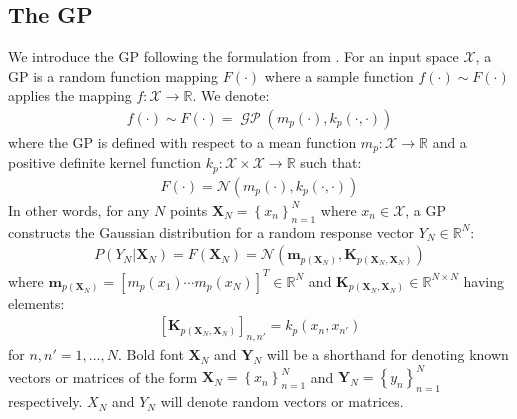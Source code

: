 \documentclass{article}
\newcommand{\GP}{\operatorname{\mathcal{GP}}}
\numberwithin{equation}{section}
\begin{document}
\subsection{The GP}\label{section:the-gp}
We introduce the GP following the formulation from \cite{rasmussen2003gaussian}. For an input space $\mathcal{X}$, a GP is a random function mapping $F(\cdot)$ where a sample function $f(\cdot) \sim F(\cdot)$ applies the mapping $f: \mathcal{X} \rightarrow \mathbb{R}$. We denote:
\begin{align}
    f(\cdot) \sim F(\cdot) = \GP\left(m_p(\cdot), k_p(\cdot, \cdot)\right)
    \label{gp}
\end{align}
where the GP is defined with respect to a mean function $m_p: \mathcal{X} \rightarrow \mathbb{R}$ and a positive definite kernel function $k_p: \mathcal{X} \times \mathcal{X} \rightarrow \mathbb{R}$ such that:
\begin{align}
    F(\cdot) = \mathcal{N}(m_p(\cdot), k_p(\cdot, \cdot))
    \label{gp-normal}
\end{align}
In other words, for any $N$ points $\mathbf{X}_N = \left\{ x_n\right\}_{n=1}^N$ where $x_n \in \mathcal{X}$, a GP constructs the Gaussian distribution for a random response vector $Y_N \in \mathbb{R}^{N}$:
\begin{align}
    \label{gp-vector}
    P\left(Y_N \vert \mathbf{X}_N\right) = F\left( \mathbf{X}_N\right) = \mathcal{N}\left(\mathbf{m}_{p\left(\mathbf{X}_N\right)}, \mathbf{K}_{p\left(\mathbf{X}_N, \mathbf{X}_N\right)}\right)
\end{align}
where $\mathbf{m}_{p(\mathbf{X}_N)} = \left[ m_p(x_1) \cdots m_p(x_N)\right]^T \in \mathbb{R}^N$ and $\mathbf{K}_{p(\mathbf{X}_N, \mathbf{X}_N)} \in \mathbb{R}^{N \times N}$ having elements:
\begin{align}
    \left[\mathbf{K}_{p(\mathbf{X}_N, \mathbf{X}_N)}\right]_{n, n'} = k_p(x_n, x_{n'})
\end{align}
for $n, n'=1,\dots, N$. Bold font $\mathbf{X}_N$ and $\mathbf{Y}_N$ will be a shorthand for denoting known vectors or matrices of the form $\mathbf{X}_N = \left\{ x_n\right\}_{n=1}^N$ and $\mathbf{Y}_N = \left\{ y_n\right\}_{n=1}^N$ respectively. $X_N$ and $Y_N$ will denote random vectors or matrices.
\end{document}
